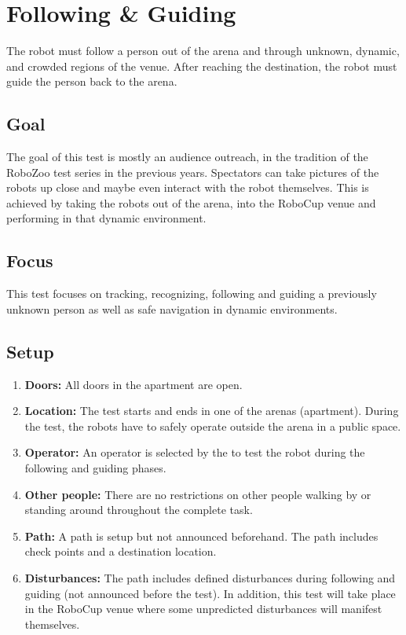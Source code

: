 \section{Following \& Guiding}

The robot must follow a person out of the arena and through unknown, dynamic, and crowded regions of the venue. 
After reaching the destination, the robot must guide the person back to the arena.

\subsection{Goal}
The goal of this test is mostly an audience outreach, in the tradition of the RoboZoo test series in the previous years. 
Spectators can take pictures of the robots up close and maybe even interact with the robot themselves. 
This is achieved by taking the robots out of the arena, into the RoboCup venue and performing in that dynamic environment. 

\subsection{Focus}
This test focuses on tracking, recognizing, following and guiding a previously unknown person as well as safe navigation in dynamic environments.

\subsection{Setup}

\begin{enumerate}
\item \textbf{Doors:} All doors in the apartment are open.
\item \textbf{Location:} The test starts and ends in one of the arenas (apartment). During the test, the robots have to safely operate outside the arena in a public space.
\item \textbf{Operator:} An operator is selected by the \TC to test the robot during the following and guiding phases.
\item \textbf{Other people:} There are no restrictions on other people walking by or standing around throughout the complete task.
\item \textbf{Path:} A path is setup but not announced beforehand. 
The path includes check points and a destination location.
\item \textbf{Disturbances:} The path includes defined disturbances during following and guiding (not announced before the test).
In addition, this test will take place in the RoboCup venue where some unpredicted disturbances will manifest themselves. 
\end{enumerate}

